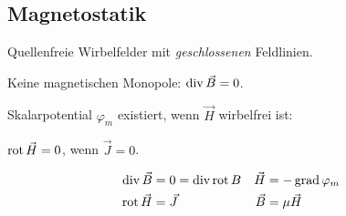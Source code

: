 

\subsection{Magnetostatik}
Quellenfreie Wirbelfelder mit \textit{geschlossenen} Feldlinien.

Keine magnetischen Monopole: $\operatorname{div} \vec{B} = 0$.

Skalarpotential $ \varphi_m$ existiert, wenn $\vec{H}$ wirbelfrei ist:

$\operatorname{rot} \vec{H} = 0$, wenn $ \vec{J}=0$.

\begin{align*}
	\operatorname{div} \vec{B} & = 0 = \operatorname{div} \operatorname{rot} B & \vec{H} & = -\operatorname{grad} \varphi_m & \\
	\operatorname{rot} \vec{H} & = \vec{J}             & \vec{B} & = \mu \vec{H}        &
\end{align*}

